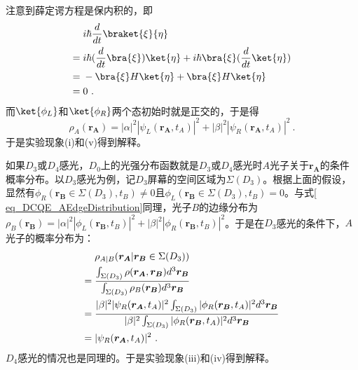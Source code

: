 注意到薛定谔方程是保内积的，即
\begin{align}
&i\hbar\frac{d}{dt}\braket{\xi}{\eta} \notag \\
={}&i\hbar(\frac{d}{dt}\bra{\xi})\ket{\eta}+i\hbar\bra{\xi}(\frac{d}{dt}\ket{\eta}) \notag \\
={}&-\bra{\xi}H\ket{\eta}+\bra{\xi}H\ket{\eta} \notag \\
={}&0~.
\end{align}
而$\ket{\phi_L}$和$\ket{\phi_R}$两个态初始时就是正交的，于是得
\begin{equation}
\rho_A(\boldsymbol{r_A})=|\alpha|^2|\psi_L(\boldsymbol{r_A},t_A)|^2+|\beta|^2|\psi_R(\boldsymbol{r_A},t_A)|^2~.
\label{eq_DCQE_AEdgeDistribution}
\end{equation}
于是实验现象(i)和(v)得到解释。

如果$D_3$或$D_4$感光，$D_0$上的光强分布函数就是$D_3$或$D_4$感光时$A$光子关于$\boldsymbol{r_A}$的条件概率分布。以$D_3$感光为例，记$D_3$屏幕的空间区域为$\Sigma(D_3)$。根据上面的假设，显然有$\phi_R(\boldsymbol{r_B}\in\Sigma(D_3),t_B)\neq 0$且$\phi_L(\boldsymbol{r_B}\in\Sigma(D_3),t_B)=0$。与式\autoref{ eq_DCQE_AEdgeDistribution}同理，光子$B$的边缘分布为$\rho_B(\boldsymbol{r_B})=|\alpha|^2|\phi_L(\boldsymbol{r_B},t_B)|^2+|\beta|^2|\phi_R(\boldsymbol{r_B},t_B)|^2$。于是在$D_3$感光的条件下，$A$光子的概率分布为：
\begin{align}
&\rho_{A|B}(\boldsymbol{r_A}|\boldsymbol{r_B}\in\Sigma(D_3)) \notag \\
={}&\frac{\int_{\Sigma(D_3)}\rho(\boldsymbol{r_A},\boldsymbol{r_B})d^3\boldsymbol{r_B}}{\int_{\Sigma(D_3)}\rho_B(\boldsymbol{r_B})d^3\boldsymbol{r_B}} \notag \\
={}&\frac{|\beta|^2|\psi_R(\boldsymbol{r_A},t_A)|^2\int_{\Sigma(D_3)}|\phi_R(\boldsymbol{r_B},t_A)|^2d^3\boldsymbol{r_B}}{|\beta|^2\int_{\Sigma(D_3)}|\phi_R(\boldsymbol{r_B},t_A)|^2d^3\boldsymbol{r_B}} \notag \\
={}&|\psi_R(\boldsymbol{r_A},t_A)|^2~.
\end{align}
$D_4$感光的情况也是同理的。于是实验现象(iii)和(iv)得到解释。

